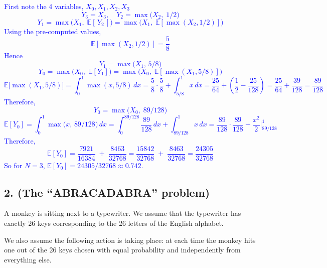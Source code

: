 \documentclass{article}
\begin{document}
\begin{enumerate}
\begin{enumerate}
        \textcolor{blue}{
         First note the 4 variables, $X_0, X_1, X_2, X_3$
\[
Y_3 = X_3,\quad
Y_2 = \max\bigl(X_2,\;1/2\bigr)
\]
\[
Y_1
= \max\bigl(X_1,\;\mathbb{E}[\,Y_2\,]\bigr)
= \max\bigl(X_1,\;\mathbb{E}[\max(X_2,1/2)]\bigr)
\]
Using the pre-computed values,
\[
\mathbb{E}[\max(X_2,1/2)]
= \frac{5}{8}
\]
Hence 
\[
Y_1 = \max\bigl(X_1,\,5/8\bigr)
\]
\[
Y_0 = \max\bigl(X_0,\;\mathbb{E}[Y_1]\bigr)
= \max\bigl(X_0,\;\mathbb{E}[\max(X_1,5/8)]\bigr)
\]
\[
\mathbb{E}\bigl[\max(X_1,5/8)\bigr]
= \int_0^1 \max(x,5/8)\,dx
= \frac{5}{8}\cdot\frac{5}{8} + \int_{5/8}^1 x\,dx
= \frac{25}{64} + \left(\frac{1}{2} - \frac{25}{128}\right)
= \frac{25}{64} + \frac{39}{128}
= \frac{89}{128}
\]
Therefore,
\[
Y_0 = \max\bigl(X_0,\; 89/128\bigr)
\]
\[
\mathbb{E}[Y_0]
= \int_0^1 \max\bigl(x,\,89/128\bigr)\,dx
= \int_0^{89/128} \frac{89}{128}\,dx + \int_{89/128}^1 x\,dx
= \frac{89}{128}\cdot\frac{89}{128} 
  + \frac{x^2}{2}\big|_{89/128}^1
\]
Therefore,
\[
\mathbb{E}[Y_0]
= \frac{7921}{16384} \;+\; \frac{8463}{32768}
= \frac{15842}{32768} \;+\; \frac{8463}{32768}
= \frac{24305}{32768}
\]
So for $N=3$, $\mathbb{E}[Y_0] = 24305/32768 \approx 0.742.$
        }

    \end{enumerate}
\end{enumerate}

\subsection*{2. (The “ABRACADABRA” problem)}

A monkey is sitting next to a typewriter. We assume that the typewriter has exactly 26 keys corresponding to the 26 letters of the English alphabet.

We also assume the following action is taking place: at each time the monkey hits one out of the 26 keys chosen with equal probability and independently from everything else.
\end{document}
